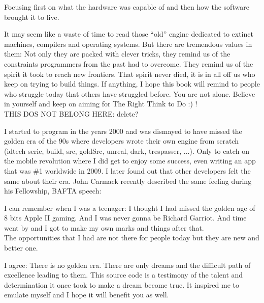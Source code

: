 \documentclass[book.tex]{subfiles}
\begin{document}
Focusing first on what the hardware was capable of and then how the software brought it to live.

\bigskip

It may seem like a waste of time to read those ``old'' engine dedicated to extinct machines, compilers and operating systems. But there are tremendous values in them: Not only they are packed with clever tricks, they remind us of the constraints programmers from the past had to overcome. They remind us of the spirit it took to reach new frontiers. That spirit never died, it is in all off us who keep on trying to build things. If anything, I hope this book will remind to people who struggle today that others have struggled before. You are not alone. Believe in yourself and keep on aiming for The Right Think to Do :) !\\

\bigskip
THIS DOS NOT BELONG HERE: delete?\\
\bigskip

I started to program in the years 2000 and was dismayed to have missed the golden era of the 90s where developers wrote their own engine from scratch (idtech serie, build, src, goldSrc, unreal, dark, trespasser, ...). Only to catch on the mobile revolution where I did get to enjoy some success, even writing an app that was \#1 worldwide in 2009. I later found out that other developers felt the same about their era. John Carmack recently described the same feeling during his Fellowship, BAFTA speech:\\

 \begin{fancyquotes}
I can remember when I was a teenager: I thought I had missed the golden age of 8 bits Apple II gaming. And I was never gonna be Richard Garriot. And time went by and I got to make
    my own marks and things after that.\\
    
    The opportunities that I had are not there for people today but they are new and better one.
 \bigskip
 \end{fancyquotes}


    
\bigskip
    I agree: There is no golden era. There are only dreams and the difficult path of excellence leading to them. This source code is a testimony of the talent and determination it once took to make a dream become true. It inspired me to emulate myself and I hope it will benefit you as well.

\bigskip


  
\end{document}
